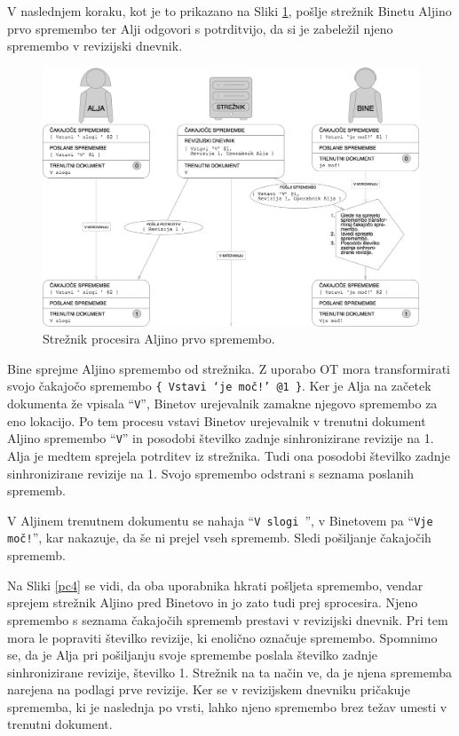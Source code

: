 \documentclass[a4paper, 12pt, twoside]{book}
\begin{document}
\pagebreak

V naslednjem koraku, kot je to prikazano na Sliki \ref{pc3}, pošlje strežnik Binetu Aljino prvo spremembo ter Alji odgovori s potrditvijo, da si je zabeležil njeno spremembo v revizijski dnevnik.

\begin{figure}[placement h]
\begin{center}
\includegraphics[width=14cm]{pc3.png}
\end{center}
\caption{Strežnik procesira Aljino prvo spremembo.}
\label{pc3}
\end{figure}

Bine sprejme Aljino spremembo od strežnika. Z uporabo OT mora transformirati svojo čakajočo spremembo {\tt \{ Vstavi ‘je moč!’ @1 \}}. Ker je Alja na začetek dokumenta že vpisala “{\tt V}”, Binetov urejevalnik zamakne njegovo spremembo za eno lokacijo. Po tem procesu vstavi Binetov urejevalnik v trenutni dokument Aljino spremembo “{\tt V}” in posodobi številko zadnje sinhronizirane revizije na 1. Alja je medtem sprejela potrditev iz strežnika. Tudi ona posodobi številko zadnje sinhronizirane revizije na 1. Svojo spremembo odstrani s seznama poslanih sprememb.

V Aljinem trenutnem dokumentu se nahaja “{\tt V slogi }”, v Binetovem pa “{\tt Vje moč!}”, kar nakazuje, da še ni prejel vseh sprememb. Sledi pošiljanje čakajočih sprememb.

\pagebreak

Na Sliki \ref{pc4} se vidi, da oba uporabnika hkrati pošljeta spremembo, vendar sprejem strežnik Aljino pred Binetovo in jo zato tudi prej sprocesira. Njeno spremembo s seznama čakajočih sprememb prestavi v revizijski dnevnik. Pri tem mora le popraviti številko revizije, ki enolično označuje spremembo. Spomnimo se, da je Alja pri pošiljanju svoje spremembe poslala številko zadnje sinhronizirane revizije, številko 1. Strežnik na ta način ve, da je njena sprememba narejena na podlagi prve revizije. Ker se v revizijskem dnevniku pričakuje sprememba, ki je naslednja po vrsti, lahko njeno spremembo brez težav umesti v trenutni dokument.
\end{document}
